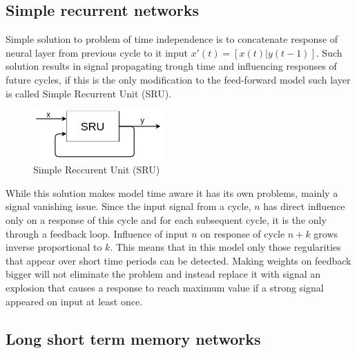 \subsection{Simple recurrent networks}
Simple solution to problem of time independence is to concatenate response of neural layer
from previous cycle to it input $x'(t)=[x(t)|y(t-1)]$.
Such solution results in signal propagating trough time and influencing responses of future cycles,
if this is the only modification to the feed-forward model such layer is called Simple Recurrent
Unit (SRU).
\begin{figure}[ht] 
	\centering
	\includegraphics[width=5cm]{res/sru}
	\caption{Simple Reccurent Unit (SRU)}
	\label{fig:sru}
\end{figure}
While this solution makes model time aware it has its own problems, mainly a signal vanishing
issue. Since the input signal from a cycle, $n$ has direct influence only on a response of this
cycle and for each subsequent cycle, it is the only through a feedback loop.
Influence of input $n$ on response of cycle $n+k$ grows inverse proportional to $k$.
This means that in this model only those regularities that appear over short time periods can
be detected.
Making weights on feedback bigger will not eliminate the problem and instead replace it with signal
an explosion that causes a response to reach maximum value if a strong signal appeared on input at
least once.

\subsection{Long short term memory networks}
